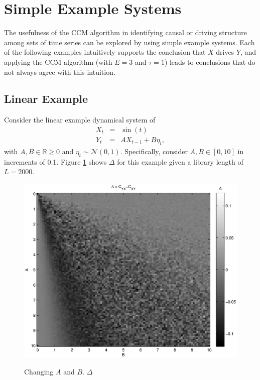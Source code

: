 \documentclass[a4paper,11pt]{article}
\begin{document}
\section{Simple Example Systems}
The usefulness of the CCM algorithm in identifying causal or driving structure among sets of time series can be explored by using simple example systems.  Each of the following examples intuitively supports the conclusion that $X$ drives $Y$, and applying the CCM algorithm (with $E=3$ and $\tau=1$) leads to conclusions that do not always agree with this intuition.

\subsection{Linear Example}
Consider the linear example dynamical system of
\begin{eqnarray}
\label{eq:linearex}
X_t &=& \sin(t)\\
Y_t &=& AX_{t-1}+B\eta_t,
\end{eqnarray}
with $A,B\in\mathbb{R}\ge 0$ and $\eta_t\sim\mathcal{N}\left(0,1\right)$.  Specifically, consider $A,B\in[0,10]$ in increments of 0.1.  Figure \ref{fig:linearex1} shows $\Delta$ for this example given a library length of $L=2000$.
\begin{center}
\begin{figure}[ht]
\includegraphics[scale=0.7]{RLCircuitPlots/LinearEx_Delta.eps} \\
\caption{Changing $A$ and $B$. $\Delta$}
\label{fig:linearex1}
\end{figure}
\end{center}
\end{document}
